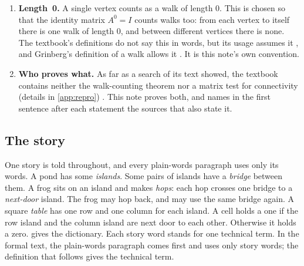 \begin{enumerate}
  \cref{def:walk}). This is the textbook's
  Definition~1.2.13, the \emph{simple path} \cite{petrosyan2015graphs}; that
  the course uses it is part of the relayed assignment \cite{userstatements}.
  The textbook's own word ``path'' means something else, which this note
  calls a \emph{trail}; \cref{tab:naming} compares the words.
\item\label{conv:length} \textbf{Length~0.} A single vertex counts as a walk
  of length 0. This is chosen so that the identity matrix $A^0=I$ counts
  walks too: from each vertex to itself there is one walk of length 0, and
  between different vertices there is none. The textbook's definitions do
  not say this in words, but its usage assumes it
  \cite[pp.~23, 49]{petrosyan2015graphs}, and Grinberg's definition of a
  walk allows it \cite[Definition~2.9.1(a), p.~36]{grinberg2025graph}. It is
  this note's own convention.
\item\label{conv:proofs} \textbf{Who proves what.} As far as a search of its
  text showed, the textbook contains neither the walk-counting theorem nor
  a matrix test for connectivity (details in \cref{app:repro})
  \cite{petrosyan2015graphs}. This note proves both, and names in the first
  sentence after each statement the sources that also state it.
\end{enumerate}

\subsection{The story}\label{sec:story}

One story is told throughout, and every plain-words paragraph uses only
its words. A pond has some \emph{islands}. Some pairs of islands have
a \emph{bridge} between them. A frog sits on an island and makes
\emph{hops}: each hop crosses one bridge to a \emph{next-door} island. The
frog may hop back, and may use the same bridge again. A square
\emph{table} has one row and one column for each island. A cell holds a
one if the row island and the column island are next door to each other.
Otherwise it holds a zero.  gives the dictionary. Each
story word stands for one technical term. In the formal text, the
plain-words paragraph comes first and uses only story words; the
definition that follows gives the technical term.

